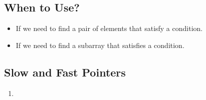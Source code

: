\subsection{When to Use?}
\begin{summary}
    \begin{itemize}
        \item If we need to find a pair of elements that satisfy a condition.
        \item If we need to find a subarray that satisfies a condition.
    \end{itemize}
\end{summary}

\subsection{Slow and Fast Pointers}
\begin{algo}
    \begin{enumerate}
        \item 
    \end{enumerate}
\end{algo}

